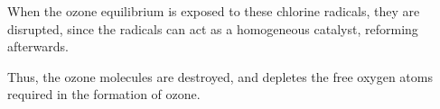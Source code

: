 		When the ozone equilibrium is exposed to these chlorine radicals, they are disrupted, since the radicals can act as a
		homogeneous catalyst, reforming afterwards.


		Thus, the ozone molecules are destroyed, and depletes the free oxygen atoms required in the formation of ozone.












